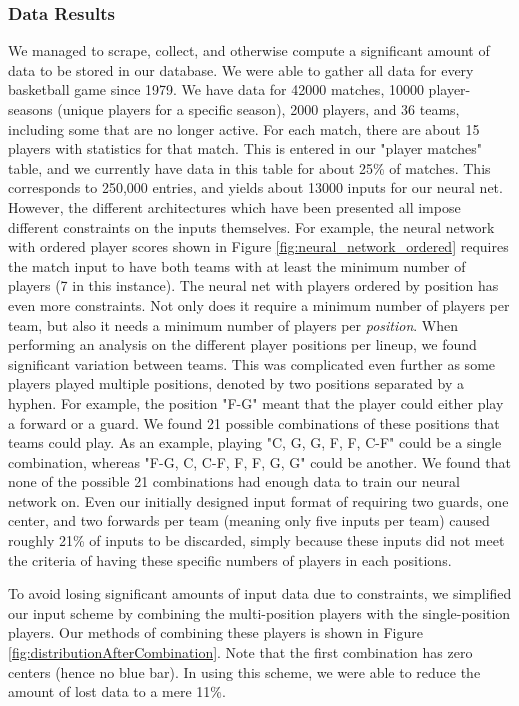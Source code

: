 \subsubsection{Data Results}
We managed to scrape, collect, and otherwise compute a significant amount of data to be stored in our database. We were able to gather all data for every basketball game since 1979. We have data for 42000 matches, 10000 player-seasons (unique players for a specific season), 2000 players, and 36 teams, including some that are no longer active. For each match, there are about 15 players with statistics for that match. This is entered in our "player matches" table, and we currently have data in this table for about 25\% of matches. This corresponds to 250,000 entries, and yields about 13000 inputs for our neural net. However, the different architectures which have been presented all impose different constraints on the inputs themselves. For example, the neural network with ordered player scores shown in Figure \ref{fig:neural_network_ordered} requires the match input to have both teams with at least the minimum number of  players (7 in this instance). The neural net with players ordered by position has even more constraints. Not only does it require a minimum number of players per team, but also it needs a minimum number of players per \textit{position}. When performing an analysis on the different player positions per lineup, we found significant variation between teams. This was complicated even further as some players played multiple positions, denoted by two positions separated by a hyphen. For example, the position "F-G" meant that the player could either play a forward or a guard. We found 21 possible combinations of these positions that teams could play. As an example, playing "C, G, G, F, F, C-F" could be a single combination, whereas "F-G, C, C-F, F, F, G, G" could be another. We found that none of the possible 21 combinations had enough data to train our neural network on. Even our initially designed input format of requiring two guards, one center, and two forwards per team (meaning only five inputs per team) caused roughly 21\% of inputs to be discarded, simply because these inputs did not meet the criteria of having these specific numbers of players in each positions.

To avoid losing significant amounts of input data due to constraints, we simplified our input scheme by combining the multi-position players with the single-position players. Our methods of combining these players is shown in Figure \ref{fig:distributionAfterCombination}. Note that the first combination has zero centers (hence no blue bar). In using this scheme, we were able to reduce the amount of lost data to a mere 11\%.

